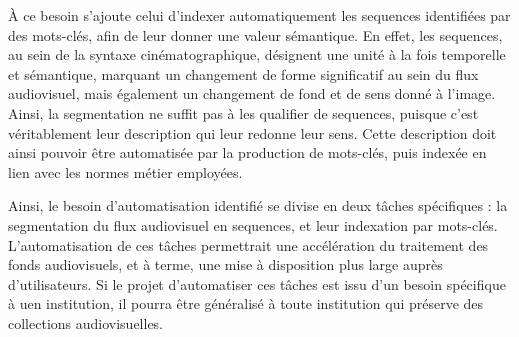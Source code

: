 À ce besoin s'ajoute celui d'indexer automatiquement les \gls{sequence}s identifiées par des mots-clés, afin de leur donner une valeur sémantique. En effet, les \gls{sequence}s, au sein de la syntaxe cinématographique, désignent une unité à la fois temporelle et sémantique, marquant un changement de forme significatif au sein du flux audiovisuel, mais également un changement de fond et de sens donné à l'image. Ainsi, la segmentation ne suffit pas à les qualifier de \gls{sequence}s, puisque c'est véritablement leur description qui leur redonne leur sens. Cette description doit ainsi pouvoir être automatisée par la production de mots-clés, puis indexée en lien avec les normes métier employées.

Ainsi, le besoin d'automatisation identifié se divise en deux tâches spécifiques : la segmentation du flux audiovisuel en \gls{sequence}s, et leur indexation par mots-clés. L'automatisation de ces tâches permettrait une accélération du traitement des fonds audiovisuels, et à terme, une mise à disposition plus large auprès d'utilisateurs. Si le projet d'automatiser ces tâches est issu d'un besoin spécifique à uen institution, il pourra être généralisé à toute institution qui préserve des collections audiovisuelles. 
